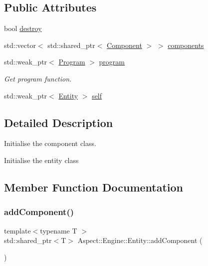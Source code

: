 \subsection*{Public Attributes}
\begin{DoxyCompactItemize}
\item 
bool \mbox{\hyperlink{class_aspect_1_1_engine_1_1_entity_a425294ababc4132392204443f47cb36a}{destroy}}
\item 
std\+::vector$<$ std\+::shared\+\_\+ptr$<$ \mbox{\hyperlink{class_aspect_1_1_engine_1_1_component}{Component}} $>$ $>$ \mbox{\hyperlink{class_aspect_1_1_engine_1_1_entity_ae7380f6b33ebbb9d4859a9de11549769}{components}}
\item 
std\+::weak\+\_\+ptr$<$ \mbox{\hyperlink{class_aspect_1_1_engine_1_1_program}{Program}} $>$ \mbox{\hyperlink{class_aspect_1_1_engine_1_1_entity_a39a0c787c384f192878e9c16f566b892}{program}}
\begin{DoxyCompactList}\small\item\em Get program function. \end{DoxyCompactList}\item 
std\+::weak\+\_\+ptr$<$ \mbox{\hyperlink{class_aspect_1_1_engine_1_1_entity}{Entity}} $>$ \mbox{\hyperlink{class_aspect_1_1_engine_1_1_entity_a23ba239d52c76b8c7f86a4ebdd189d26}{self}}
\end{DoxyCompactItemize}


\subsection{Detailed Description}
Initialise the component class. 

Initialise the entity class 

\subsection{Member Function Documentation}
\mbox{\label{class_aspect_1_1_engine_1_1_entity_ae7a087ed64f4fec3b61ff2cba098d19a}} 
\subsubsection{\texorpdfstring{add\+Component()}{addComponent()}\hspace{0.1cm}{\footnotesize\ttfamily [1/3]}}
{\footnotesize\ttfamily template$<$typename T $>$ \\
std\+::shared\+\_\+ptr$<$T$>$ Aspect\+::\+Engine\+::\+Entity\+::add\+Component (\begin{DoxyParamCaption}{ }\end{DoxyParamCaption})\hspace{0.3cm}{\ttfamily [inline]}}



